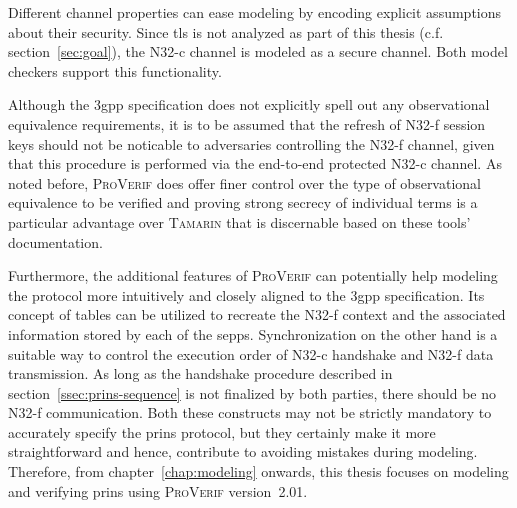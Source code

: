 Different channel properties can ease modeling by encoding explicit assumptions about their security.
Since \gls{tls} is not analyzed as part of this thesis (c.f. section~\ref{sec:goal}), the N32-c channel is modeled as a secure channel.
Both model checkers support this functionality.

Although the \gls{3gpp} specification does not explicitly spell out any observational equivalence requirements, it is to be assumed that the refresh of N32-f session keys should not be noticable to adversaries controlling the N32-f channel, given that this procedure is performed via the end-to-end protected N32-c channel.
As noted before, \textsc{ProVerif} does offer finer control over the type of observational equivalence to be verified and proving strong secrecy of individual terms is a particular advantage over \textsc{Tamarin} that is discernable based on these tools' documentation.

Furthermore, the additional features of \textsc{ProVerif} can potentially help modeling the protocol more intuitively and closely aligned to the \gls{3gpp} specification.
Its concept of tables can be utilized to recreate the N32-f context and the associated information stored by each of the \glspl{sepp}.
Synchronization on the other hand is a suitable way to control the execution order of \mbox{N32-c} handshake and N32-f data transmission.
As long as the handshake procedure described in section~\ref{ssec:prins-sequence} is not finalized by both parties, there should be no N32-f communication.
Both these constructs may not be strictly mandatory to accurately specify the \gls{prins} protocol, but they certainly make it more straightforward and hence, contribute to avoiding mistakes during modeling.
Therefore, from chapter~\ref{chap:modeling} onwards, this thesis focuses on modeling and verifying \gls{prins} using \textsc{ProVerif} version~2.01.